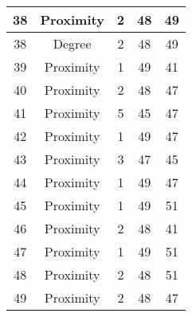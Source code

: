 \documentclass[results.tex]{subfiles}
\begin{document}
\begin{center}
\begin{tabular}{| c || c | c | c | c |}
            \hline
            38                      & Proximity                    & 2                      & 48                      & 49                   \\
            \hline
            38                      & Degree                       & 2                      & 48                      & 49                   \\
            \hline
            39                      & Proximity                    & 1                      & 49                      & 41                   \\
            \hline
            40                      & Proximity                    & 2                      & 48                      & 47                   \\
            \hline
            41                      & Proximity                    & 5                      & 45                      & 47                   \\
            \hline
            42                      & Proximity                    & 1                      & 49                      & 47                   \\
            \hline
            43                      & Proximity                    & 3                      & 47                      & 45                   \\
            \hline
            44                      & Proximity                    & 1                      & 49                      & 47                   \\
            \hline
            45                      & Proximity                    & 1                      & 49                      & 51                   \\
            \hline
            46                      & Proximity                    & 2                      & 48                      & 41                   \\
            \hline
            47                      & Proximity                    & 1                      & 49                      & 51                   \\
            \hline
            48                      & Proximity                    & 2                      & 48                      & 51                   \\
            \hline
            49                      & Proximity                    & 2                      & 48                      & 47                   \\
            \hline
        \end{tabular}
    \end{center}
\end{document}
